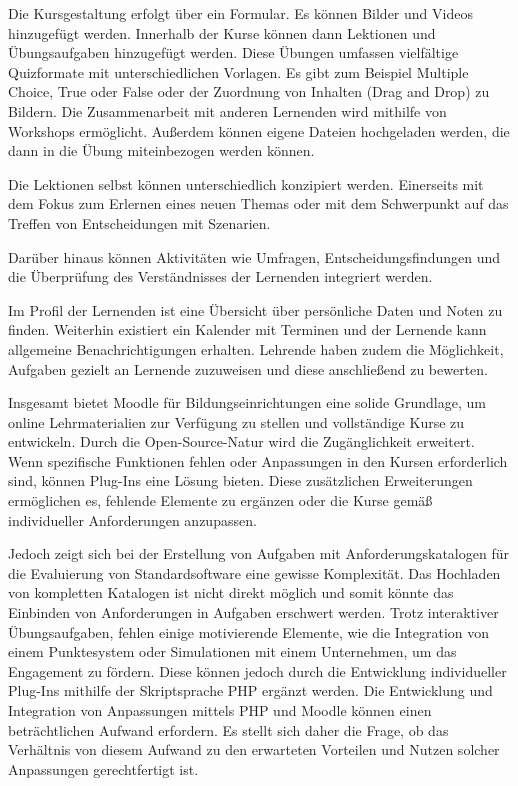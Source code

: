 Die Kursgestaltung erfolgt über ein Formular. Es können Bilder und Videos hinzugefügt werden. Innerhalb der Kurse können dann Lektionen und Übungsaufgaben hinzugefügt werden.
Diese Übungen umfassen vielfältige Quizformate mit unterschiedlichen Vorlagen. Es gibt zum Beispiel Multiple Choice, True oder False oder der Zuordnung von Inhalten (Drag and Drop) zu Bildern. Die Zusammenarbeit mit anderen Lernenden wird mithilfe von Workshops ermöglicht. Außerdem können eigene Dateien hochgeladen werden, die dann in die Übung miteinbezogen werden können. 

Die Lektionen selbst können unterschiedlich konzipiert werden. Einerseits mit dem Fokus zum Erlernen eines neuen Themas oder mit dem Schwerpunkt auf das Treffen von Entscheidungen mit Szenarien.

Darüber hinaus können Aktivitäten wie Umfragen, Entscheidungsfindungen und die Überprüfung des Verständnisses der Lernenden integriert werden. 

Im Profil der Lernenden ist eine Übersicht über persönliche Daten und Noten zu finden. 
Weiterhin existiert ein Kalender mit Terminen und der Lernende kann allgemeine Benachrichtigungen erhalten.
Lehrende haben zudem die Möglichkeit, Aufgaben gezielt an Lernende zuzuweisen und diese anschließend zu bewerten.

Insgesamt bietet Moodle für Bildungseinrichtungen eine solide Grundlage, um online Lehrmaterialien zur Verfügung zu stellen und vollständige Kurse zu entwickeln. 
Durch die Open-Source-Natur wird die Zugänglichkeit erweitert. 
Wenn spezifische Funktionen fehlen oder Anpassungen in den Kursen erforderlich sind, können Plug-Ins eine Lösung bieten. Diese zusätzlichen Erweiterungen ermöglichen es, fehlende Elemente zu ergänzen oder die Kurse gemäß individueller Anforderungen anzupassen.

Jedoch zeigt sich bei der Erstellung von Aufgaben mit Anforderungskatalogen für die Evaluierung von Standardsoftware eine gewisse Komplexität. Das Hochladen von kompletten Katalogen ist nicht direkt möglich und somit könnte das Einbinden von Anforderungen in Aufgaben erschwert werden.
Trotz interaktiver Übungsaufgaben, fehlen einige motivierende Elemente, wie die Integration von einem Punktesystem oder Simulationen mit einem Unternehmen, um das Engagement zu fördern.
Diese können jedoch durch die Entwicklung individueller Plug-Ins mithilfe der Skriptsprache PHP ergänzt werden.
Die Entwicklung und Integration von Anpassungen mittels PHP und Moodle können einen beträchtlichen Aufwand erfordern. Es stellt sich daher die Frage, ob das Verhältnis von diesem Aufwand zu den erwarteten Vorteilen und Nutzen solcher Anpassungen gerechtfertigt ist.

